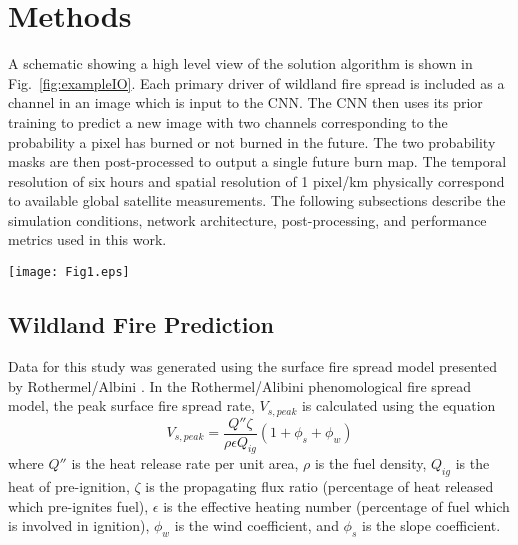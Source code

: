 \documentclass[smallcondensed]{svjour3}     %
\begin{document}
\section{Methods}
\label{s:Methods}

A schematic showing a high level view of the solution algorithm is shown
in Fig.~\ref{fig:exampleIO}.
Each primary driver of wildland fire spread is included as a channel in an
image which is input to the CNN.
The CNN then uses its prior training to predict a new image with two channels
corresponding to the probability a pixel has burned or not burned in the future.
The two probability masks are then post-processed to output a single future
burn map. The temporal resolution of six hours and spatial resolution of 1 pixel/km
physically correspond to available global satellite measurements.
The following subsections describe the simulation conditions, network architecture,
post-processing, and performance metrics used in this work.

\begin{figure*}[htb]
  \texttt{[image: Fig1.eps]}
\caption{Schematic of solution algorithm. The left set of images show the
different channels used as inputs to the neural network. The values for each
data channel are colorized based on the values shown in
Table~\ref{tab:paramsLimits} and Table~\ref{tab:paramsExample}.}
\label{fig:exampleIO}       %
\end{figure*}



\subsection{Wildland Fire Prediction}
\label{ss:Wfp}

Data for this study was generated using the surface fire spread model
presented by Rothermel/Albini
\cite{rothermel1972mathematical,scott2005standard,albini1976estimating}.
In the Rothermel/Alibini phenomological fire spread model, the peak
surface fire spread rate, $V_{s,peak}$ is calculated using the equation
\begin{equation}
V_{s,peak} = \frac{Q''\zeta}{\rho\epsilon Q_{ig}}\left(1+\phi_{s}+\phi_{w}\right)
\label{eq:rothermel}
\end{equation}
where $Q''$ is the heat release rate per unit area, $\rho$ is the
fuel density, $Q_{ig}$ is the heat of pre-ignition, $\zeta$ is the
propagating flux ratio (percentage of heat released which pre-ignites
fuel), $\epsilon$ is the effective heating number (percentage of fuel
which is involved in ignition), $\phi_{w}$ is the wind coefficient,
and $\phi_{s}$ is the slope coefficient.
\end{document}
